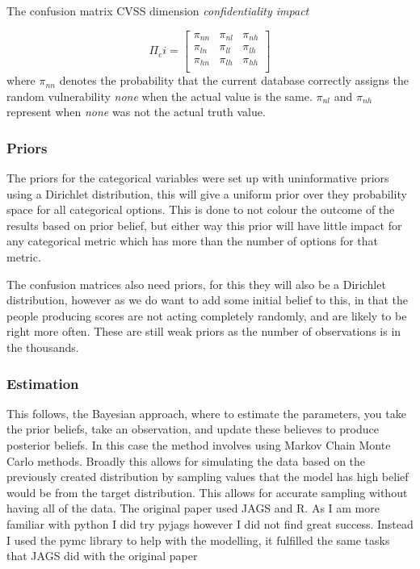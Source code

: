 \documentclass[12pt]{article}
\begin{document}
\bigskip

The confusion matrix CVSS dimension \textit{confidentiality impact}


\begin{equation}
	\Pi_ci = \begin{bmatrix}
		\pi_{nn} & \pi_{nl} & \pi_{nh} \\
		\pi_{ln} & \pi_{ll} & \pi_{lh} \\
		\pi_{hn} & \pi_{lh} & \pi_{hh} \\
	\end{bmatrix}
\end{equation}
where $\pi_{nn}$ denotes the probability that the current database correctly assigns the random
vulnerability \emph{none} when the actual value is the same. $\pi_{nl}$ and $\pi_{nh}$ represent
when \emph{none} was not the actual truth value.

\subsubsection{Priors}

The priors for the categorical variables were set up with uninformative priors using a Dirichlet
distribution, this will give a uniform prior over they probability space for all categorical
options. This is done to not colour the outcome of the results based on prior belief, but either
way this prior will have little impact for any categorical metric which has more than the number of
options for that metric.

The confusion matrices also need priors, for this they will also be a Dirichlet distribution,
however as we do want to add some initial belief to this, in that the people producing scores are
not acting completely randomly, and are likely to be right more often. These are still weak priors
as the number of observations is in the thousands.

\subsubsection{Estimation}

This follows, the Bayesian approach, where to estimate the parameters, you take the prior beliefs,
take an observation, and update these believes to produce posterior beliefs. In this case the method
involves using Markov Chain Monte Carlo methods. Broadly this allows for simulating the data based
on the previously created distribution by sampling values that the model has high belief would be
from the target distribution. This allows for accurate sampling without having all of the data. The
original paper used JAGS\cite{JAGS} and R. As I am more familiar with python I did try
pyjags\cite{pyjags} however I did not find great success. Instead I used the pymc library to help
with the modelling, it fulfilled the same tasks that JAGS did with the original paper\cite{bayes}
\end{document}
